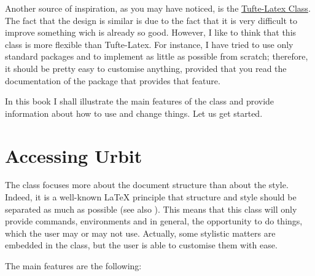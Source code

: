 Another source of inspiration, as you may have noticed, is the
\href{https://github.com/Tufte-LaTeX/tufte-latex}{Tufte-Latex Class}.
The fact that the design is similar is due to the fact that it is very
difficult to improve something wich is already so good. However, I like
to think that this class is more flexible than Tufte-Latex. For
instance, I have tried to use only standard packages and to implement as
little as possible from scratch; therefore, it should be pretty easy
to customise anything, provided that you read the documentation of the
package that provides that feature.


In this book I shall illustrate the main features of the class and
provide information about how to use and change things. Let us get
started.

\section{Accessing Urbit}

The  class focuses more about the document structure than
about the style. Indeed, it is a well-known \LaTeX\xspace principle that
structure and style should be separated as much as possible (see also
). This means that this class will only provide
commands, environments and in general, the opportunity to do things,
which the user may or may not use. Actually, some stylistic matters are
embedded in the class, but the user is able to customise them with ease.

The main features are the following:

